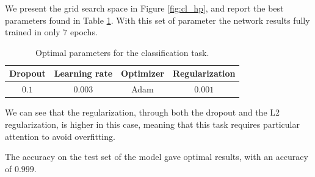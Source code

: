 We present the grid search space in Figure \ref{fig:cl_hp}, and report the best parameters found in 
Table \ref{tab:cl_par}. With this set of parameter the network results fully trained in only $7$ epochs.
\begin{table}[h]
    \centering
    \begin{tabular}{cccc} \hline
        Dropout & Learning rate & Optimizer & Regularization  \\ \hline
        $0.1$   & $0.003$       & Adam      & $0.001$         
    \end{tabular}
    \caption{Optimal parameters for the classification task.}
    \label{tab:cl_par}
\end{table}
We can see that the regularization, through both the dropout and the L2 regularization, is higher in this case, meaning that this 
task requires particular attention to avoid overfitting.

The accuracy on the test set of the model gave optimal results, with an accuracy of $0.999$.

